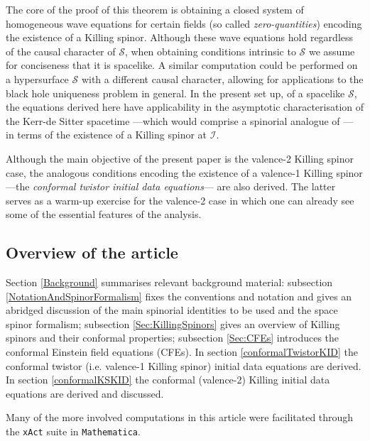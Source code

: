 \documentclass[10pt,a4paper]{article}
\theoremstyle{plain}
\begin{document}
   The core of the proof of this theorem is
   obtaining a closed system of homogeneous wave equations for certain fields
   (so called \emph{zero-quantities}) encoding the existence of a Killing spinor. Although these wave
   equations hold regardless of the causal character of $\mathcal{S}$,
   when obtaining conditions intrinsic to $\mathcal{S}$ we assume for conciseness
   that it is spacelike.  A similar
   computation could be performed on a hypersurface $\mathcal{S}$ with
   a different causal character, allowing for applications to
   the black hole uniqueness problem in general.
   In the present set up, of a spacelike $\mathcal{S}$,
   the equations derived here have applicability in the asymptotic characterisation
   of the Kerr-de Sitter spacetime ---which would comprise a spinorial analogue of \cite{MarPaeSenSim16}---
   in terms of the existence of a Killing spinor at $\mathscr{I}$. 
\medskip 

    Although the main objective of the present paper is the valence-2 Killing spinor case, the analogous conditions encoding the
    existence of a valence-1 Killing spinor ---the \emph{conformal
  twistor initial data equations}--- are also derived.  The
    latter serves as a warm-up exercise for the valence-2 case in which one can already see some of the essential features of the analysis.


\subsection*{Overview of the article}
  Section \ref{Background} summarises relevant background material:
  subsection \ref{NotationAndSpinorFormalism} fixes the conventions
  and notation and gives an abridged discussion of the main spinorial
  identities to be used and the space spinor formalism; subsection
  \ref{Sec:KillingSpinors} gives an overview of Killing spinors and
  their conformal properties; subsection \ref{Sec:CFEs} introduces the conformal
  Einstein field equations (CFEs).  In section
  \ref{conformalTwistorKID} the conformal
  twistor (i.e. valence-1 Killing spinor) initial data equations are derived. In section \ref{conformalKSKID} the conformal (valence-2) Killing initial data
  equations are derived and discussed.
  
  \medskip 
  
  Many of the more involved computations in this article were
facilitated through the {\tt xAct} suite in {\tt Mathematica}.
\end{document}
